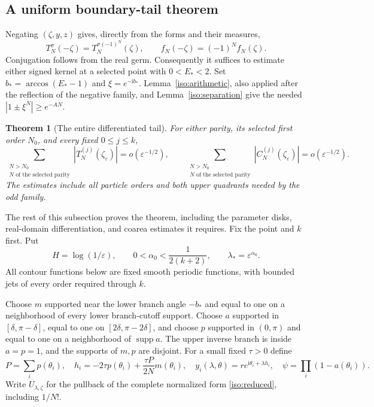 \documentclass[11pt]{article}
\numberwithin{equation}{section}
\newtheorem{theorem}{Theorem}[section]
\theoremstyle{definition}
\newcommand{\ii}{\mathrm i}
\newcommand{\eps}{\varepsilon}
\begin{document}
\subsection{A uniform boundary-tail theorem}

Negating $(\zeta,y,z)$ gives, directly from the forms and their measures,
\begin{equation}
 T_N^\sigma(-\zeta)=T_N^{\sigma(-1)^N}(\zeta),\qquad
 f_N(-\zeta)=(-1)^Nf_N(\zeta).
 \label{iso:sign}
\end{equation}
Conjugation follows from the real germ. Consequently it suffices to
estimate either signed kernel at a selected point with $0<E_*<2$.
Set $b_*=\arccos(E_*-1)$ and $\xi=e^{-\ii b_*}$.
Lemma~\ref{iso:arithmetic}, also applied after the reflection of the
negative family, and Lemma~\ref{iso:separation} give the needed
$|1\pm\xi^N|\ge e^{-AN}$.

\begin{theorem}[The entire differentiated tail]\label{iso:tail}
For either parity, its selected first order $N_0$, and every fixed
$0\le j\le k$,
\[
 \sum_{\substack{N>N_0\\N\text{ of the selected parity}}}
 |T_N^{(j)}(\zeta_\eps)|=o(\eps^{-1/2}),\qquad
 \sum_{\substack{N>N_0\\N\text{ of the selected parity}}}
 |C_N^{(j)}(\zeta_\eps)|=o(\eps^{-1/2}).
\]
The estimates include all particle orders and both upper quadrants
needed by the odd family.
\end{theorem}

The rest of this subsection proves the theorem, including the parameter
disks, real-domain differentiation, and coarea estimates it requires.
Fix the point and $k$ first. Put
\[
 H=\log(1/\eps),\qquad 0<\alpha_0<\frac1{2(k+2)},\qquad
 \lambda_*=\eps^{\alpha_0}.
\]
All contour functions below are fixed smooth periodic functions, with
bounded jets of every order required through $k$.

Choose $m$ supported near the lower branch angle $-b_*$ and equal to one
on a neighborhood of every lower branch-cutoff support. Choose $a$
supported in $[\delta,\pi-\delta]$, equal to one on
$[2\delta,\pi-2\delta]$, and choose $p$ supported in $(0,\pi)$ and
equal to one on a neighborhood of $\operatorname{supp}a$.
The upper inverse branch is inside $a=p=1$, and the supports of $m,p$
are disjoint. For a small fixed $\tau>0$ define
\[
 P=\sum_i p(\theta_i),\quad
 h_i=-2\tau p(\theta_i)+\frac{\tau P}{2N}m(\theta_i),\quad
 y_i(\lambda,\theta)=r e^{\ii\theta_i+\lambda h_i},\quad
 \psi=\prod_i(1-a(\theta_i)).
\]
Write $U_{\lambda,\zeta}$ for the pullback of the complete normalized
form \eqref{iso:reduced}, including $1/N!$.
\end{document}
